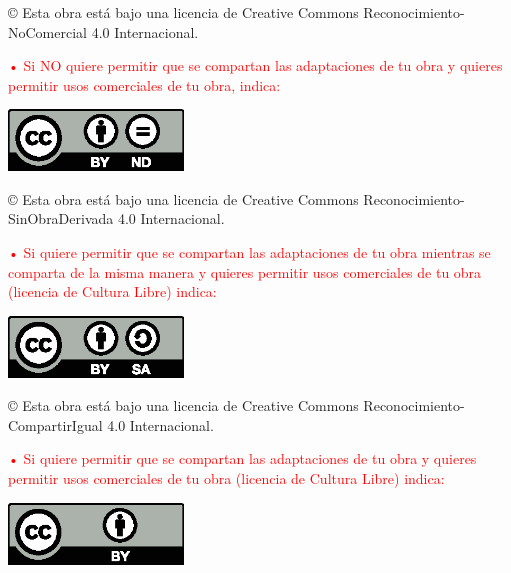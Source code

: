 \documentclass[a4paper,12pt,oneside]{scrbook}
\begin{document}
\begin{large}
© Esta obra está bajo una licencia de Creative Commons Reconocimiento-NoComercial 4.0 Internacional.
\end{large}

\bigskip
\bigskip
\bigskip
\textcolor{red}{• Si NO quiere permitir que se compartan las adaptaciones de tu obra y quieres permitir usos comerciales de tu obra, indica:}

\begin{center}
\includegraphics[width=4.66cm]{images/licenses/by-nd}
\end{center}

\begin{large}
© Esta obra está bajo una licencia de Creative Commons Reconocimiento-SinObraDerivada 4.0 Internacional.
\end{large}

\bigskip
\bigskip
\bigskip
\textcolor{red}{• Si quiere permitir que se compartan las adaptaciones de tu obra mientras se comparta de la misma manera y quieres permitir usos comerciales de tu obra (licencia de Cultura Libre) indica:}

\begin{center}
\includegraphics[width=4.66cm]{images/licenses/by-sa}
\end{center}

\begin{large}
© Esta obra está bajo una licencia de Creative Commons Reconocimiento-CompartirIgual 4.0 Internacional.
\end{large}

\bigskip
\bigskip
\bigskip
\textcolor{red}{• Si quiere permitir que se compartan las adaptaciones de tu obra y quieres permitir usos comerciales de tu obra (licencia de Cultura Libre) indica:}

\begin{center}
\includegraphics[width=4.66cm]{images/licenses/by}
\end{center}
\end{document}
